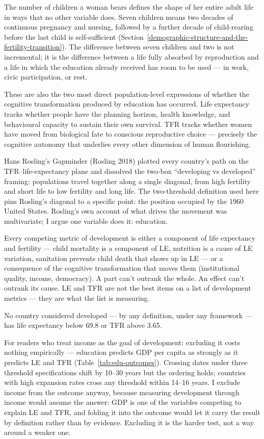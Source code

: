 \documentclass[12pt,letterpaper]{article}
\begin{document}
The number of children a woman bears defines the shape of her entire
adult life in ways that no other variable does. Seven children means
two decades of continuous pregnancy and nursing, followed by a further
decade of child-rearing before the last child is self-sufficient
(Section~\ref{demographic-structure-and-the-fertility-transition}).
The difference between seven children and two is not incremental; it
is the difference between a life fully absorbed by reproduction and a
life in which the education already received has room to be used --- in
work, civic participation, or rest.

These are also the two most direct population-level expressions of
whether the cognitive transformation produced by education has
occurred. Life expectancy tracks whether people have the planning
horizon, health knowledge, and behavioural capacity to sustain their
own survival. TFR tracks whether women have moved from biological fate
to conscious reproductive choice --- precisely the cognitive autonomy
that underlies every other dimension of human flourishing.

Hans Rosling's Gapminder (Rosling 2018) plotted every country's
path on the TFR--life-expectancy plane and dissolved the two-box
``developing vs developed'' framing: populations travel together
along a single diagonal, from high fertility and short life to low
fertility and long life. The two-threshold definition used here pins Rosling's
diagonal to a specific point: the position occupied by the 1960
United States. Rosling's own account of what drives the movement was
multivariate; I argue one variable does it: education.

Every competing metric of development is either a component of life
expectancy and fertility --- child mortality is a component of LE,
nutrition is a cause of LE variation, sanitation prevents child death
that shows up in LE --- or a consequence of the cognitive
transformation that moves them (institutional quality, income,
democracy). A part can't outrank the whole. An effect can't outrank
its cause. LE and TFR are not the best items on a list of
development metrics --- they are what the list is measuring.

No country considered developed --- by any definition, under any
framework --- has life expectancy below 69.8 or TFR above 3.65.

For readers who treat income as the goal of development: excluding
it costs nothing empirically --- education predicts GDP per capita
as strongly as it predicts LE and TFR (Table~\ref{tab:edu-outcomes}).
Crossing dates under three threshold specifications shift by 10--30
years but the ordering holds; countries with high expansion rates
cross any threshold within 14--16 years. I exclude income from the
outcome anyway, because measuring development through income would
assume the answer: GDP is one of the variables competing to explain
LE and TFR, and folding it into the outcome would let it carry the
result by definition rather than by evidence. Excluding it is the
harder test, not a way around a weaker one.
\end{document}
